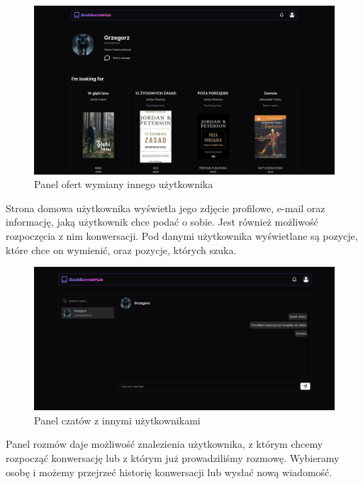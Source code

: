 \documentclass[12pt]{article}
\begin{document}
\newpage
\begin{figure}[h!]
	\centering
	\includegraphics[width=17.5cm]{figures/Obraz13.png}
	\caption{Panel ofert wymiany innego użytkownika}
\end{figure}
Strona domowa użytkownika wyświetla jego zdjęcie profilowe, 
e-mail oraz informację, jaką użytkownik chce podać o sobie. 
Jest również możliwość rozpoczęcia z nim konwersacji. 
Pod danymi użytkownika wyświetlane są pozycje, 
które chce on wymienić, oraz pozycje, których szuka.

\newpage
\begin{figure}[h!]
	\centering
	\includegraphics[width=17.5cm]{figures/Obraz14.png}
	\caption{Panel czatów z innymi użytkownikami}
\end{figure}
Panel rozmów daje możliwość znalezienia użytkownika, 
z którym chcemy rozpocząć konwersację lub 
z którym już prowadziliśmy rozmowę. 
Wybieramy osobę i możemy przejrzeć historię konwersacji lub wysłać nową wiadomość.
\end{document}
